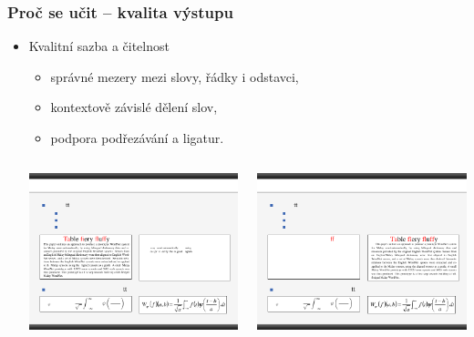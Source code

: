 \begin{frame}[t]
	\frametitle{Proč se učit  -- kvalita výstupu}
	\begin{itemize}
		\item Kvalitní sazba a čitelnost
			\begin{itemize}
				\item správné mezery mezi slovy, řádky i odstavci,
				\item kontextově závislé dělení slov,
				\item podpora podřezávání a ligatur.
			\end{itemize}
			\medskip
			\begin{columns}[t]
				\begin{column}{0.45\textwidth}
					\includegraphics[width=\columnwidth]{Lecture1/Figures/ParagraphSample1.pdf}
				\end{column}
				\begin{column}{0.45\textwidth}
					\includegraphics[width=\columnwidth]{Lecture1/Figures/ParagraphSample2.pdf}

\end{column}
\end{columns}
\end{itemize}
\end{frame}

